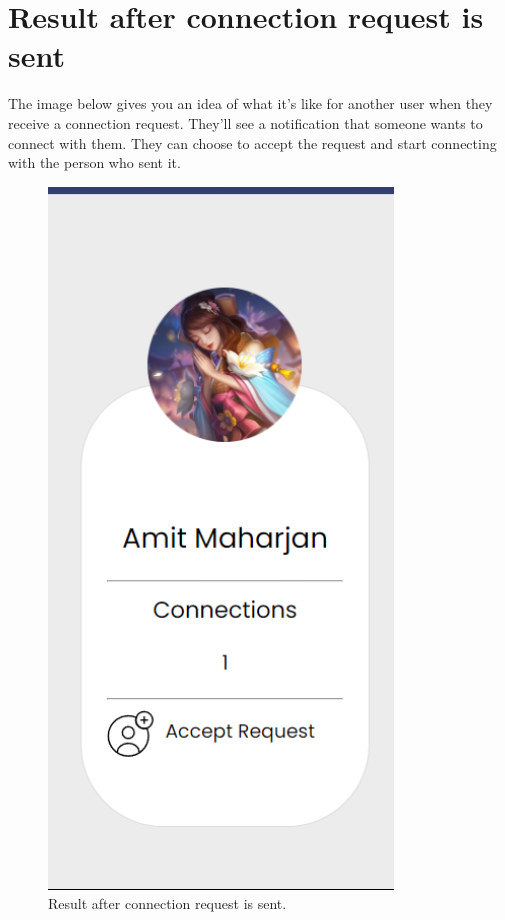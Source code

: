 \section{Result after connection request is sent}
The image below gives you an idea of what it's like for another user when they receive a connection request. They'll see a notification that someone wants to connect with them. They can choose to accept the request and start connecting with the person who sent it. 
\begin{figure}[ht]
    \centering
    \includegraphics[height=0.3\textheight]{Outcome-ss/accept-request.png}
    \caption{Result after connection request is sent.}
    \label{fig:Result after connection request is sent}
\end{figure}
